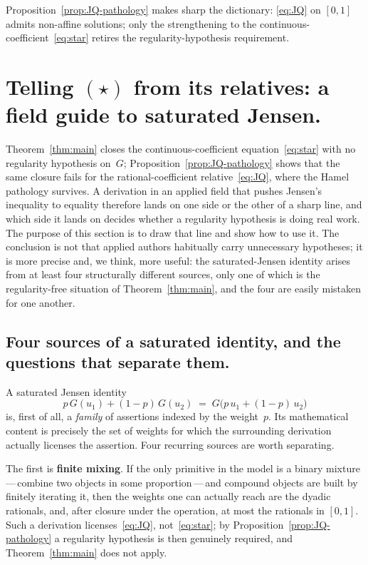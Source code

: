 \documentclass{article}
\theoremstyle{plain}
\theoremstyle{definition}
\begin{document}
Proposition~\ref{prop:JQ-pathology} makes sharp the dictionary:
\eqref{eq:JQ} on $[0,1]$ admits non-affine solutions; only the
strengthening to the continuous-coefficient~\eqref{eq:star} retires the
regularity-hypothesis requirement.

\section{Telling $(\star)$ from its relatives: a field guide to saturated Jensen.}
\label{sec:recurrence}

Theorem~\ref{thm:main} closes the continuous-coefficient
equation~\eqref{eq:star} with no regularity hypothesis on~$G$;
Proposition~\ref{prop:JQ-pathology} shows that the same closure fails
for the rational-coefficient relative~\eqref{eq:JQ}, where the Hamel
pathology survives. A derivation in an applied field that pushes
Jensen's inequality to equality therefore lands on one side or the
other of a sharp line, and which side it lands on decides whether a
regularity hypothesis is doing real work. The purpose of this section
is to draw that line and show how to use it. The conclusion is not
that applied authors habitually carry unnecessary hypotheses; it is
more precise and, we think, more useful: the saturated-Jensen identity
arises from at least four structurally different sources, only one of
which is the regularity-free situation of Theorem~\ref{thm:main}, and
the four are easily mistaken for one another.

\subsection{Four sources of a saturated identity, and the questions that separate them.}
\label{ssec:diagnostic}

A saturated Jensen identity
\[
p\,G(u_1)+(1-p)\,G(u_2)\;=\;G\bigl(p\,u_1+(1-p)\,u_2\bigr)
\]
is, first of all, a \emph{family} of assertions indexed by the
weight~$p$. Its mathematical content is precisely the set of weights
for which the surrounding derivation actually licenses the assertion.
Four recurring sources are worth separating.

The first is \textbf{finite mixing}. If the only primitive in the
model is a binary mixture\,---\,combine two objects in some
proportion\,---\,and compound objects are built by finitely iterating
it, then the weights one can actually reach are the dyadic rationals,
and, after closure under the operation, at most the rationals in
$[0,1]$. Such a derivation licenses~\eqref{eq:JQ}, not~\eqref{eq:star};
by Proposition~\ref{prop:JQ-pathology} a regularity hypothesis is then
genuinely required, and Theorem~\ref{thm:main} does not apply.
\end{document}
